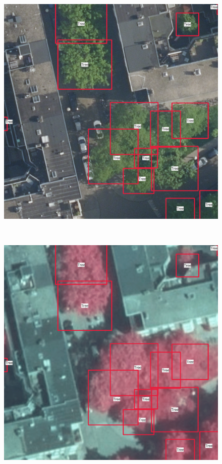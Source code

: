 \documentclass[
  letterpaper,
  DIV=11,
  numbers=noendperiod]{scrartcl}
\begin{document}
\begin{figure}

\begin{minipage}{0.48\linewidth}

\includegraphics{images/Training_image/RGB_image.png}

\end{minipage}%
%
\begin{minipage}{0.04\linewidth}
~\end{minipage}%
%
\begin{minipage}{0.48\linewidth}

\includegraphics{images/Training_image/CIR_image.png}


\end{minipage}
\end{figure}
\end{document}
